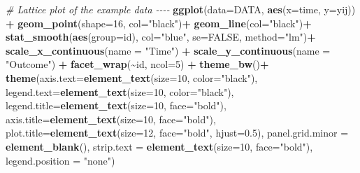 \documentclass[
]{article}
\newenvironment{Shaded}{\begin{snugshade}}{\end{snugshade}}
\newcommand{\AttributeTok}[1]{\textcolor[rgb]{0.13,0.29,0.53}{#1}}
\newcommand{\CommentTok}[1]{\textcolor[rgb]{0.56,0.35,0.01}{\textit{#1}}}
\newcommand{\ConstantTok}[1]{\textcolor[rgb]{0.56,0.35,0.01}{#1}}
\newcommand{\DecValTok}[1]{\textcolor[rgb]{0.00,0.00,0.81}{#1}}
\newcommand{\FloatTok}[1]{\textcolor[rgb]{0.00,0.00,0.81}{#1}}
\newcommand{\FunctionTok}[1]{\textcolor[rgb]{0.13,0.29,0.53}{\textbf{#1}}}
\newcommand{\NormalTok}[1]{#1}
\newcommand{\SpecialCharTok}[1]{\textcolor[rgb]{0.81,0.36,0.00}{\textbf{#1}}}
\newcommand{\StringTok}[1]{\textcolor[rgb]{0.31,0.60,0.02}{#1}}
\begin{document}
\begin{Shaded}
\begin{Highlighting}[]
\CommentTok{\# Lattice plot of the example data {-}{-}{-}{-}}
\FunctionTok{ggplot}\NormalTok{(}\AttributeTok{data=}\NormalTok{DATA, }\FunctionTok{aes}\NormalTok{(}\AttributeTok{x=}\NormalTok{time, }\AttributeTok{y=}\NormalTok{yij)) }\SpecialCharTok{+}
  \FunctionTok{geom\_point}\NormalTok{(}\AttributeTok{shape=}\DecValTok{16}\NormalTok{, }\AttributeTok{col=}\StringTok{"black"}\NormalTok{)}\SpecialCharTok{+}
  \FunctionTok{geom\_line}\NormalTok{(}\AttributeTok{col=}\StringTok{"black"}\NormalTok{)}\SpecialCharTok{+}
  \FunctionTok{stat\_smooth}\NormalTok{(}\FunctionTok{aes}\NormalTok{(}\AttributeTok{group=}\NormalTok{id), }\AttributeTok{col=}\StringTok{"blue"}\NormalTok{, }\AttributeTok{se=}\ConstantTok{FALSE}\NormalTok{, }
              \AttributeTok{method=}\StringTok{"lm"}\NormalTok{)}\SpecialCharTok{+}
  \FunctionTok{scale\_x\_continuous}\NormalTok{(}\AttributeTok{name =} \StringTok{"Time"}\NormalTok{) }\SpecialCharTok{+}
  \FunctionTok{scale\_y\_continuous}\NormalTok{(}\AttributeTok{name =} \StringTok{"Outcome"}\NormalTok{) }\SpecialCharTok{+}
  \FunctionTok{facet\_wrap}\NormalTok{(}\SpecialCharTok{\textasciitilde{}}\NormalTok{id, }\AttributeTok{ncol=}\DecValTok{5}\NormalTok{) }\SpecialCharTok{+}
  \FunctionTok{theme\_bw}\NormalTok{()}\SpecialCharTok{+}
  \FunctionTok{theme}\NormalTok{(}\AttributeTok{axis.text=}\FunctionTok{element\_text}\NormalTok{(}\AttributeTok{size=}\DecValTok{10}\NormalTok{, }\AttributeTok{color=}\StringTok{"black"}\NormalTok{),}
        \AttributeTok{legend.text=}\FunctionTok{element\_text}\NormalTok{(}\AttributeTok{size=}\DecValTok{10}\NormalTok{, }\AttributeTok{color=}\StringTok{"black"}\NormalTok{),}
        \AttributeTok{legend.title=}\FunctionTok{element\_text}\NormalTok{(}\AttributeTok{size=}\DecValTok{10}\NormalTok{, }\AttributeTok{face=}\StringTok{"bold"}\NormalTok{),}
        \AttributeTok{axis.title=}\FunctionTok{element\_text}\NormalTok{(}\AttributeTok{size=}\DecValTok{10}\NormalTok{, }\AttributeTok{face=}\StringTok{"bold"}\NormalTok{),}
        \AttributeTok{plot.title=}\FunctionTok{element\_text}\NormalTok{(}\AttributeTok{size=}\DecValTok{12}\NormalTok{, }\AttributeTok{face=}\StringTok{"bold"}\NormalTok{, }\AttributeTok{hjust=}\FloatTok{0.5}\NormalTok{),}
        \AttributeTok{panel.grid.minor =} \FunctionTok{element\_blank}\NormalTok{(),}
        \AttributeTok{strip.text =} \FunctionTok{element\_text}\NormalTok{(}\AttributeTok{size=}\DecValTok{10}\NormalTok{, }\AttributeTok{face=}\StringTok{"bold"}\NormalTok{),}
        \AttributeTok{legend.position =} \StringTok{"none"}\NormalTok{)}
\end{Highlighting}
\end{Shaded}
\end{document}
